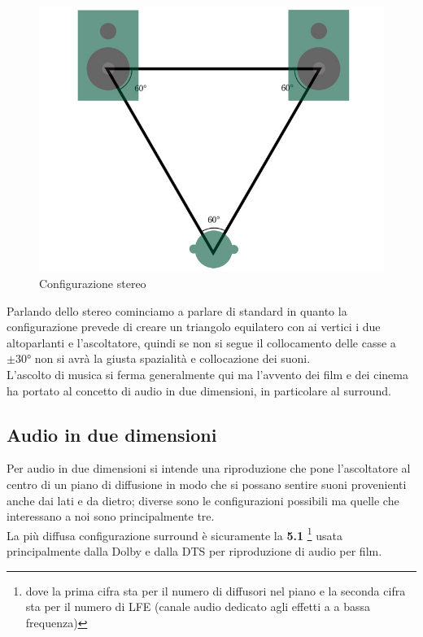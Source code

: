 \documentclass[12pt,a4paper]{report}
\begin{document}
\begin{figure}[htbp]
	\centering
	\includegraphics[scale=0.30]{figures/stereo.jpg}
	\caption {Configurazione stereo} 
	\label{fig:stereo}
	\end{figure}

Parlando dello stereo cominciamo a parlare di standard in quanto la configurazione prevede di creare un triangolo equilatero con ai vertici i due altoparlanti e l'ascoltatore,  quindi se non si segue il collocamento delle casse a $\pm 30°$ non si avrà la giusta spazialità e collocazione dei suoni.\\

L'ascolto di musica si ferma generalmente qui ma l'avvento dei film e dei cinema ha portato al concetto di audio in due dimensioni, in particolare al surround.

\subsection{Audio in due dimensioni}

Per audio in due dimensioni si intende una riproduzione che pone l'ascoltatore al centro di un piano di diffusione in modo che si possano sentire suoni provenienti anche dai lati e da dietro; diverse sono le configurazioni possibili ma quelle che interessano a noi sono principalmente tre.\\

La più diffusa configurazione surround è sicuramente la \textbf{5.1} \footnote{dove la prima cifra sta per il numero di diffusori nel piano e la seconda cifra sta per il numero di LFE (canale audio dedicato agli effetti a a bassa frequenza)} usata principalmente dalla Dolby e dalla DTS per riproduzione di audio per film.
\end{document}
